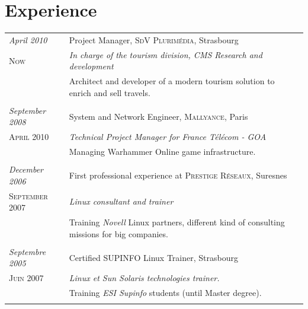 \documentclass[a4paper,10pt]{article}
\begin{document}
\section{Experience}
\begin{tabular}{p{}|p{}}	
  \emph{April 2010} & Project Manager, \textsc{SdV Plurimédia}, Strasbourg \\\textsc{Now}&\emph{ In charge of the tourism division, CMS Research and development  }\\&\footnotesize{Architect and developer of a modern tourism solution to enrich and sell travels.}\\\multicolumn{2}{c}{} \\
  
 \emph{September 2008} & System and Network Engineer, \textsc{Mallyance}, Paris \\\textsc{April 2010}&\emph{Technical Project Manager for France Télécom - GOA}\\&\footnotesize{Managing Warhammer Online game infrastructure.}\\\multicolumn{2}{c}{} \\
 \emph{December 2006} & First professional experience at \textsc{Prestige Réseaux}, Suresnes \\\textsc{September 2007}&\emph{Linux consultant and trainer}\\&\footnotesize{Training \emph{Novell} Linux partners, different kind of consulting missions for big companies.}\\\multicolumn{2}{c}{} \\
 \emph{Septembre 2005} & Certified \textsc{SUPINFO} Linux Trainer, Strasbourg \\\textsc{Juin 2007}&\emph{Linux et Sun Solaris technologies trainer.}\\&\footnotesize{Training \emph{ESI Supinfo} students (until Master degree).}\\\multicolumn{2}{c}{}
\end{tabular}
\end{document}
